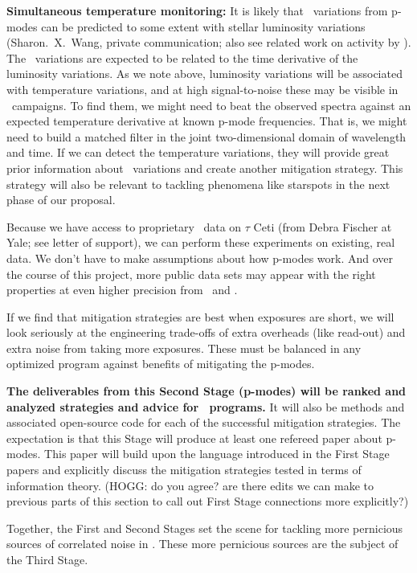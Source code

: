 \documentclass[12pt, letterpaper]{article}
\begin{document}
\begin{itemize}
\textbf{Simultaneous temperature monitoring:}
It is likely that \RV\ variations from p-modes can be predicted
to some extent with stellar luminosity variations
(Sharon.~X.~Wang, private communication; also see related work on activity by \citealt{Aigrain}).
The \RV\ variations are expected to be related to the time derivative of the
luminosity variations.
As we note above, luminosity variations will be associated with
temperature variations, and at high signal-to-noise these may be
visible in \EPRV\ campaigns.
To find them, we might need to beat the observed spectra against an
expected temperature derivative at known p-mode frequencies.
That is, we might need to build a matched filter in the joint
two-dimensional domain of wavelength and time.
If we can detect the temperature variations, they will provide great
prior information about \RV\ variations and create another mitigation
strategy. 
This strategy will also be relevant to tackling phenomena like starspots in
the next phase of our proposal.
\end{itemize}

\noindent
Because we have access to proprietary \EXPRES\ data on $\tau$ Ceti 
(from Debra Fischer at Yale; see letter of support),
we can perform these experiments on existing, real data.
We don't have to make assumptions about how p-modes work.
And over the course of this project, more public data sets may appear
with the right properties at even higher precision from \ESPRESSO\ and \NEID.

If we find that mitigation strategies are best when exposures
are short, we will look seriously at the engineering trade-offs
of extra overheads (like read-out) and extra noise from taking
more exposures. These must be balanced in any optimized program
against benefits of mitigating the p-modes.

\textbf{The deliverables from this Second Stage (p-modes) will be ranked
and analyzed strategies and advice for \EPRV\ programs.} It will
also be methods and associated open-source code for each of the successful
mitigation strategies.
The expectation is that this Stage will produce at least one
refereed paper about p-modes. 
This paper will build upon the language introduced in the First Stage 
papers and explicitly discuss the mitigation strategies tested in 
terms of information theory. (HOGG: do you agree? are there edits we
can make to previous parts of this section to call out First Stage 
connections more explicitly?)

Together, the First and Second Stages set the scene for tackling more
pernicious sources of correlated noise in \EPRV.
These more pernicious sources are the subject of the Third Stage.
\end{document}

